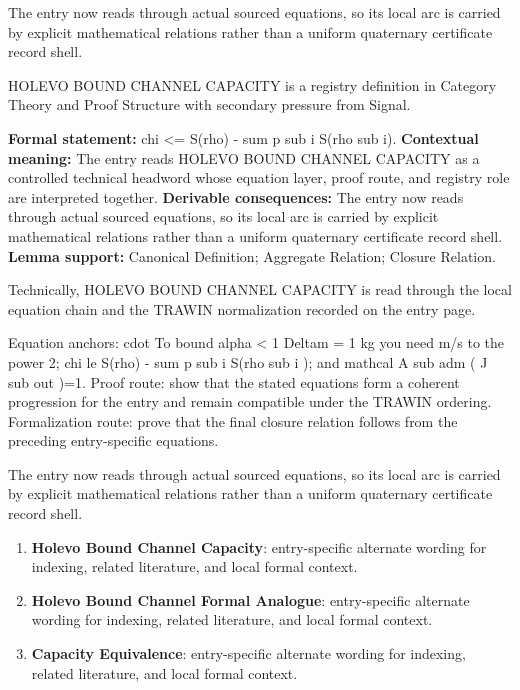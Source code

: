 The entry now reads through actual sourced equations, so its local arc is carried by explicit mathematical relations rather than a uniform quaternary certificate record shell.
\clearpage


\begingroup\small
{}
HOLEVO BOUND CHANNEL CAPACITY is a registry definition in Category Theory and Proof Structure with secondary pressure from Signal.

\begingroup\footnotesize\setlength{\emergencystretch}{3em}\sloppy
\textbf{Formal statement:} chi <= S(rho) - sum p sub i S(rho sub i). \textbf{Contextual meaning:} The entry reads HOLEVO BOUND CHANNEL CAPACITY as a controlled technical headword whose equation layer, proof route, and registry role are interpreted together. \textbf{Derivable consequences:} The entry now reads through actual sourced equations, so its local arc is carried by explicit mathematical relations rather than a uniform quaternary certificate record shell. \textbf{Lemma support:} Canonical Definition; Aggregate Relation; Closure Relation.\par
\endgroup

Technically, HOLEVO BOUND CHANNEL CAPACITY is read through the local equation chain and the TRAWIN normalization recorded on the entry page.

Equation anchors: cdot To bound alpha < 1 Deltam = 1 kg you need m/s to the power 2; chi le S(rho) - sum p sub i S(rho sub i ); and mathcal A sub adm ( J sub out )=1. Proof route: show that the stated equations form a coherent progression for the entry and remain compatible under the TRAWIN ordering. Formalization route: prove that the final closure relation follows from the preceding entry-specific equations.

The entry now reads through actual sourced equations, so its local arc is carried by explicit mathematical relations rather than a uniform quaternary certificate record shell.
\endgroup

\begin{enumerate}[leftmargin=1.6em,itemsep=6pt,topsep=4pt]
\item \textbf{Holevo Bound Channel Capacity}: entry-specific alternate wording for indexing, related literature, and local formal context.
\item \textbf{Holevo Bound Channel Formal Analogue}: entry-specific alternate wording for indexing, related literature, and local formal context.
\item \textbf{Capacity Equivalence}: entry-specific alternate wording for indexing, related literature, and local formal context.
\end{enumerate}

